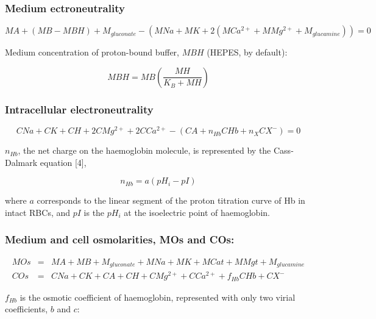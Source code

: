\documentclass[a4paper]{article}
\newcommand{\med}[1]{M#1}
\newcommand{\cell}[1]{C#1}
\newcommand{\MA}{\med{A}}
\newcommand{\MB}{\med{B}}
\newcommand{\MBH}{\med{BH}}
\newcommand{\MGluca}{M_{glucamine}}
\newcommand{\MNa}{\med{Na}}
\newcommand{\MK}{\med{K}}
\newcommand{\MCatp}{\med{Ca^{2+}}}
\newcommand{\MMgtp}{\med{Mg^{2+}}}
\newcommand{\MGluco}{M_{gluconate}}
\newcommand{\MH}{\med{H}}
\newcommand{\MOs}{\med{Os}}
\newcommand{\MCat}{\med{Cat}}
\newcommand{\MMgt}{\med{Mgt}}
\newcommand{\KB}{K_B}
\newcommand{\CNa}{\cell{Na}}
\newcommand{\CK}{\cell{K}}
\newcommand{\CH}{\cell{H}}
\newcommand{\CMgtp}{\cell{Mg^{2+}}}
\newcommand{\CCatp}{\cell{Ca^{2+}}}
\newcommand{\CA}{\cell{A}}
\newcommand{\nHb}{n_{Hb}}
\newcommand{\CHb}{\cell{Hb}}
\newcommand{\nX}{n_{X}}
\newcommand{\CXm}{\cell{X^{-}}}
\newcommand{\COs}{\cell{Os}}
\newcommand{\pH}[1]{pH_{#1}}
\newcommand{\pI}{pI}
\newcommand{\fHb}{f_{Hb}}
\begin{document}
\subsubsection{Medium ectroneutrality}\label{medium-electroneutrality}

\begin{equation}
\MA + (\MB - \MBH) + \MGluco-(\MNa + \MK + 2(\MCatp + \MMgtp + \MGluca)) = 0 \tag{1}
\end{equation}

Medium concentration of proton-bound buffer, $\MBH$ (HEPES, by default):

\setcounter{equation}{1}

\begin{equation}
\MBH = \MB\left(\frac{\MH}{\KB + \MH}\right)
\end{equation}

\subsubsection{Intracellular electroneutrality}

\begin{equation}
\CNa + \CK + \CH + 2\CMgtp + 2\CCatp - (\CA + \nHb\CHb + \nX\CXm) = 0
\end{equation}

$\nHb$, the net charge on the haemoglobin molecule, is represented by the Cass-Dalmark equation [4],

\begin{equation}
\nHb=  a(\pH{i} - \pI)
\end{equation}

where $a$ corresponds to the linear segment of the proton titration curve of Hb in intact RBCs, and $\pI$ is the $\pH{i}$ at the isoelectric point of haemoglobin.

\subsubsection{Medium and cell osmolarities, MOs and COs:}

\begin{eqnarray}
	\MOs &=& \MA + \MB + \MGluco + \MNa + \MK + \MCat + \MMgt + \MGluca\\
	\COs &=& \CNa + \CK + \CA + \CH + \CMgtp + \CCatp  + \fHb\CHb + \CXm
\end{eqnarray}

$\fHb$ is the osmotic coefficient of haemoglobin, represented with only two virial coefficients, $b$ and $c$:
\end{document}
